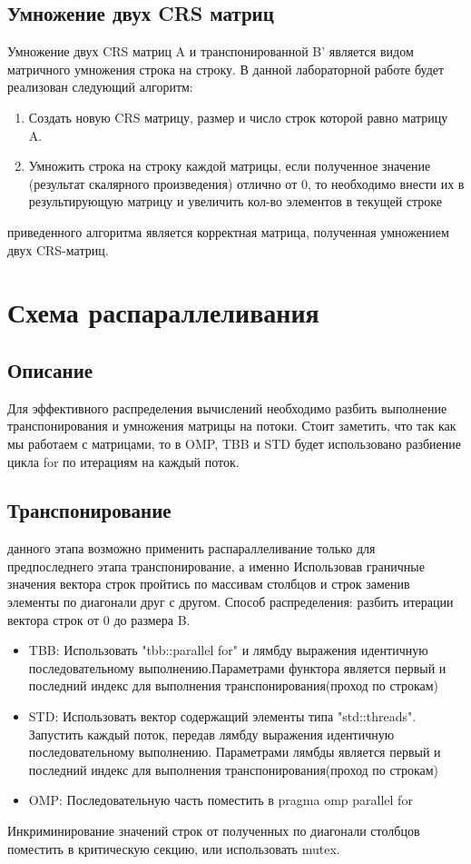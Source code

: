 \documentclass{report}
\begin{document}
\subsection*{Умножение двух CRS матриц}
\par Умножение двух CRS матриц A и транспонированной B’ является видом матричного умножения строка на строку. В данной лабораторной работе будет реализован следующий алгоритм:
\begin{enumerate}
\item Создать новую CRS матрицу, размер и число строк которой равно матрицу A.
\item Умножить строка на строку каждой матрицы, если полученное значение (результат скалярного произведения) отлично от 0, то необходимо внести их в результирующую матрицу и увеличить кол-во элементов в текущей строке
\end{enumerate}
 приведенного алгоритма является корректная матрица, полученная умножением двух CRS-матриц.
\newpage
\section*{Схема распараллеливания}
\subsection*{Описание}
\par Для эффективного распределения вычислений необходимо разбить выполнение транспонирования и умножения матрицы на потоки. Стоит заметить, что так как мы работаем с матрицами, то в OMP, TBB и STD будет использовано разбиение цикла for по итерациям на каждый поток.
\subsection*{Транспонирование}
 данного этапа возможно применить распараллеливание только для предпоследнего этапа транспонирование, а именно Использовав граничные значения вектора строк пройтись по массивам столбцов и строк заменив элементы по диагонали друг с другом.  Способ распределения: разбить итерации вектора строк от 0 до размера B.
\begin{itemize}
\item TBB: Использовать "tbb::parallel for" и лямбду выражения идентичную последовательному выполнению.Параметрами функтора является первый и последний индекс для выполнения транспонирования(проход по строкам)
\item STD: Использовать вектор содержащий элементы типа "std::threads". Запустить каждый поток, передав лямбду выражения идентичную последовательному выполнению. Параметрами лямбды является первый и последний индекс для выполнения транспонирования(проход по строкам)
\item OMP: Последовательную часть поместить в pragma omp parallel for
\end{itemize}
\par Инкриминирование значений строк от полученных по диагонали столбцов поместить в критическую секцию, или использовать mutex.
\newpage
\end{document}
